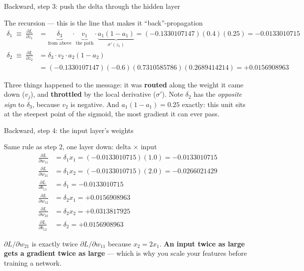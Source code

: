 \documentclass[aspectratio=169]{beamer}
\begin{document}
\begin{frame}[shrink=6]{Backward, step 3: push the delta through the hidden layer}
  \begin{block}{The recursion --- this is the line that makes it
    ``back''-propagation}
    \begin{align*}
      \delta_1 \;\equiv\; \frac{\partial L}{\partial z_1}
        &= \underbrace{\delta_3}_{\text{from above}}
           \cdot \underbrace{v_1}_{\text{the path}}
           \cdot \underbrace{a_1(1-a_1)}_{\sigma'(z_1)}
         = (-0.1330107147)(0.4)(0.25) = \mathbf{-0.0133010715}\\
      \delta_2 \;\equiv\; \frac{\partial L}{\partial z_2}
        &= \delta_3 \cdot v_2 \cdot a_2(1-a_2)\\
        &= (-0.1330107147)(-0.6)(0.7310585786)(0.2689414214)
         = \mathbf{+0.0156908963}
    \end{align*}
  \end{block}
  \begin{center}\small
    Three things happened to the message: it was \textbf{routed} along the
    weight it came down ($v_j$), and \textbf{throttled} by the local
    derivative ($\sigma'$). Note $\delta_2$ has the \emph{opposite sign} to
    $\delta_3$, because $v_2$ is negative. And
    $a_1(1-a_1) = 0.25$ exactly: this unit sits at the steepest point of the
    sigmoid, the most gradient it can ever pass.
  \end{center}
\end{frame}

\begin{frame}[shrink=6]{Backward, step 4: the input layer's weights}
  \begin{block}{Same rule as step 2, one layer down: delta $\times$ input}
    \begin{align*}
      \frac{\partial L}{\partial w_{11}} &= \delta_1 x_1
        = (-0.0133010715)(1.0) = \mathbf{-0.0133010715}\\
      \frac{\partial L}{\partial w_{21}} &= \delta_1 x_2
        = (-0.0133010715)(2.0) = \mathbf{-0.0266021429}\\
      \frac{\partial L}{\partial b_{11}} &= \delta_1
        = \mathbf{-0.0133010715}\\
      \frac{\partial L}{\partial w_{12}} &= \delta_2 x_1
        = \mathbf{+0.0156908963}\\
      \frac{\partial L}{\partial w_{22}} &= \delta_2 x_2
        = \mathbf{+0.0313817925}\\
      \frac{\partial L}{\partial b_{12}} &= \delta_2
        = \mathbf{+0.0156908963}
    \end{align*}
  \end{block}
  \begin{center}\small
    $\partial L/\partial w_{21}$ is exactly twice
    $\partial L/\partial w_{11}$ because $x_2 = 2x_1$. \textbf{An input twice
    as large gets a gradient twice as large} --- which is why you scale your
    features before training a network.
  \end{center}
\end{frame}
\end{document}
